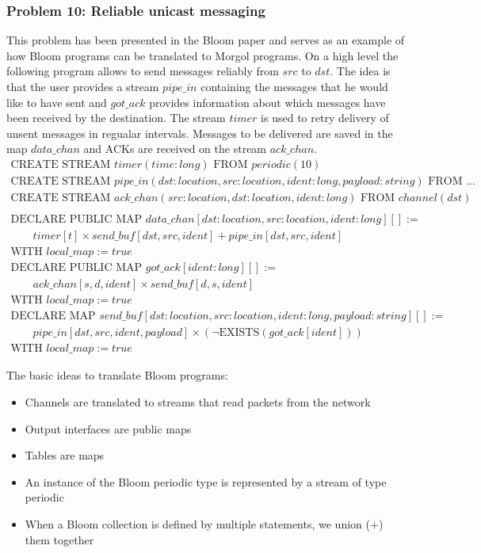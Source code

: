 \documentclass[11pt]{article}
\begin{document}
\subsubsection*{Problem 10: Reliable unicast messaging}
This problem has been presented in the Bloom paper and serves as an example of how Bloom programs can be translated to Morgol programs.
On a high level the following program allows to send messages reliably from $src$ to $dst$.
The idea is that the user provides a stream $pipe\_in$ containing the messages that he would like to have sent and $got\_ack$ provides information about which messages have been received by the destination.
The stream $timer$ is used to retry delivery of unsent messages in regualar intervals.
Messages to be delivered are saved in the map $data\_chan$ and ACKs are received on the stream $ack\_chan$.
\[
\begin{array}{l}
\text{CREATE STREAM } timer(time: long) \text{ FROM } periodic(10) \\
\text{CREATE STREAM } pipe\_in(dst : location, src : location, ident : long, payload : string) \text{ FROM } ... \\
\text{CREATE STREAM } ack\_chan(src : location, dst : location, ident : long) \text{ FROM } channel(dst)\\
\\
\text{DECLARE PUBLIC MAP } data\_chan [dst : location, src : location, ident : long][] := \\
\qquad timer[t] \times send\_buf[dst, src, ident] + pipe\_in[dst, src, ident]\\
\text{WITH } local\_map := true \\
\text{DECLARE PUBLIC MAP } got\_ack [ident : long][] := \\
\qquad ack\_chan[s, d, ident] \times send\_buf[d, s, ident]\\
\text{WITH } local\_map := true \\
\text{DECLARE MAP } send\_buf [dst : location, src : location, ident : long, payload : string][] := \\
\qquad pipe\_in[dst, src, ident, payload] \times (\neg\text{EXISTS}(got\_ack[ident])) \\
\text{WITH } local\_map := true
\end{array}
\]

The basic ideas to translate Bloom programs:
\begin{itemize}
\item Channels are translated to streams that read packets from the network
\item Output interfaces are public maps
\item Tables are maps
\item An instance of the Bloom periodic type is represented by a stream of type periodic
\item When a Bloom collection is defined by multiple statements, we union ($+$) them together
\end{itemize} 
\end{document}
